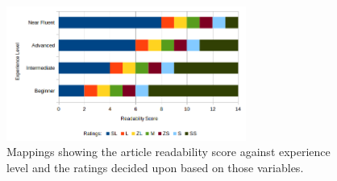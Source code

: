 \begin{figure}[H]
	\caption[Aritcle Rating Mappings]{Mappings showing the article readability score against experience level and the ratings decided upon based on those variables.}
	\label{fig:ratings}
	\begin{center}
	\includegraphics[width=0.7\textwidth]{Graphics/Ratings}
\end{center}
\end{figure}